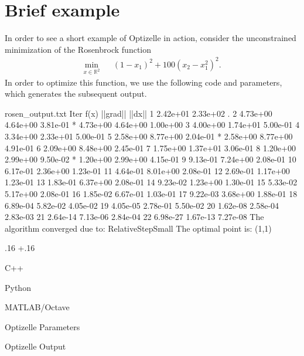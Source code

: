 \documentclass{report}
\newenvironment{boldlist}
    {\begin{list}{}{
        \labelwidth.16\textwidth
        \leftmargin\dimexpr\leftmargin+.16\textwidth
        \renewcommand\makelabel[1]{%
            \textbf{##1}}}}
    {\vspace{-\dimexpr\baselineskip+2\itemsep}\end{list}}
\newcommand{\exampleitem}[2]{
    \item[Language] #1
    \item[Code] #2
    \item[]}
\newcommand{\re}{\mathbb{R}}
\newcommand{\secrosenbrock}{Rosenbrock}
\newcommand{\examplelabel}[2]{\index{Examples!#1}\label{#2}}
\begin{document}
\section{Brief example}\examplelabel{\secrosenbrock}{sec:rosenbrock}

        In order to see a short example of Optizelle in action, consider the unconstrained minimization of the Rosenbrock function
$$
    \begin{array}{rcl}
        \min\limits_{x\in\re^2} && (1-x_1)^2+100(x_2-x_1^2)^2.
    \end{array}
$$
In order to optimize this function, we use the following code and parameters, which generates the subsequent output.

\begin{filecontents*}{rosen_output.txt}
Iter        f(x)        ||grad||    ||dx||      
1           2.42e+01    2.33e+02    .           
2           4.73e+00    4.64e+00    3.81e-01    
*           4.73e+00    4.64e+00    1.00e+00    
3           4.00e+00    1.74e+01    5.00e-01    
4           3.34e+00    2.33e+01    5.00e-01    
5           2.58e+00    8.77e+00    2.04e-01    
*           2.58e+00    8.77e+00    4.91e-01    
6           2.09e+00    8.48e+00    2.45e-01    
7           1.75e+00    1.37e+01    3.06e-01    
8           1.20e+00    2.99e+00    9.50e-02    
*           1.20e+00    2.99e+00    4.15e-01    
9           9.13e-01    7.24e+00    2.08e-01    
10          6.17e-01    2.36e+00    1.23e-01    
11          4.64e-01    8.01e+00    2.08e-01    
12          2.69e-01    1.17e+00    1.23e-01    
13          1.83e-01    6.37e+00    2.08e-01    
14          9.23e-02    1.23e+00    1.30e-01    
15          5.33e-02    5.17e+00    2.08e-01    
16          1.85e-02    6.67e-01    1.03e-01    
17          9.22e-03    3.68e+00    1.88e-01    
18          6.89e-04    5.82e-02    4.05e-02    
19          4.05e-05    2.78e-01    5.50e-02    
20          1.62e-08    2.58e-04    2.83e-03    
21          2.64e-14    7.13e-06    2.84e-04    
22          6.98e-27    1.67e-13    7.27e-08    
The algorithm converged due to: RelativeStepSmall
The optimal point is: (1,1) 
\end{filecontents*}

\begin{boldlist}
    \exampleitem
        {C++}
        {}

    \exampleitem
        {Python}
        {}

    \exampleitem
        {MATLAB/Octave}
        {}

    \exampleitem
        {Optizelle Parameters}
        {}

    \exampleitem
        {Optizelle Output}
        {}
\end{boldlist}
\end{document}
